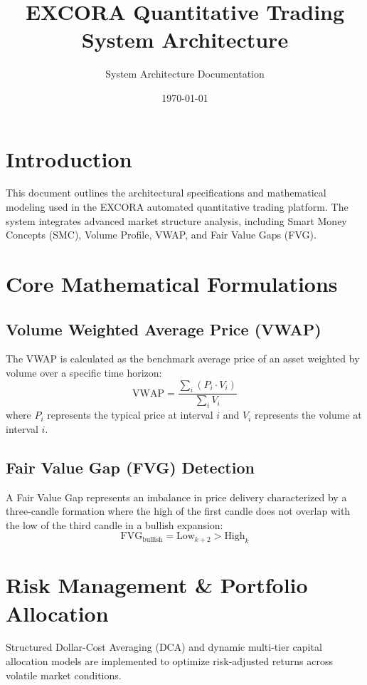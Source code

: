 \documentclass[11pt,a4paper]{article}
\title{\textbf{EXCORA Quantitative Trading System Architecture}}
\author{System Architecture Documentation}
\date{\today}
\begin{document}
\maketitle

\section{Introduction}
This document outlines the architectural specifications and mathematical modeling used in the EXCORA automated quantitative trading platform. The system integrates advanced market structure analysis, including Smart Money Concepts (SMC), Volume Profile, VWAP, and Fair Value Gaps (FVG).

\section{Core Mathematical Formulations}

\subsection{Volume Weighted Average Price (VWAP)}
The VWAP is calculated as the benchmark average price of an asset weighted by volume over a specific time horizon:
\begin{equation}
\text{VWAP} = \frac{\sum_{i} (P_i \cdot V_i)}{\sum_{i} V_i}
\end{equation}
where $P_i$ represents the typical price at interval $i$ and $V_i$ represents the volume at interval $i$.

\subsection{Fair Value Gap (FVG) Detection}
A Fair Value Gap represents an imbalance in price delivery characterized by a three-candle formation where the high of the first candle does not overlap with the low of the third candle in a bullish expansion:
\begin{equation}
\text{FVG}_{\text{bullish}} = \text{Low}_{k+2} > \text{High}_{k}
\end{equation}

\section{Risk Management \& Portfolio Allocation}
Structured Dollar-Cost Averaging (DCA) and dynamic multi-tier capital allocation models are implemented to optimize risk-adjusted returns across volatile market conditions.
\end{document}
